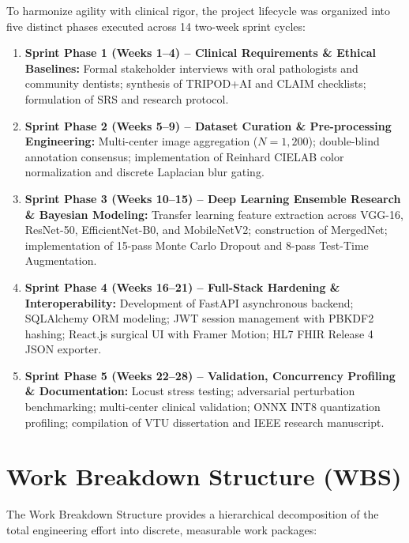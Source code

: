 \documentclass[12pt,a4paper,oneside]{report}
\begin{document}
To harmonize agility with clinical rigor, the project lifecycle was organized into five distinct phases executed across 14 two-week sprint cycles:

\begin{enumerate}[label=\arabic*.]
    \item \textbf{Sprint Phase 1 (Weeks 1--4) -- Clinical Requirements \& Ethical Baselines:} Formal stakeholder interviews with oral pathologists and community dentists; synthesis of TRIPOD+AI and CLAIM checklists; formulation of SRS and research protocol.
    \item \textbf{Sprint Phase 2 (Weeks 5--9) -- Dataset Curation \& Pre-processing Engineering:} Multi-center image aggregation ($N = 1{,}200$); double-blind annotation consensus; implementation of Reinhard CIELAB color normalization and discrete Laplacian blur gating.
    \item \textbf{Sprint Phase 3 (Weeks 10--15) -- Deep Learning Ensemble Research \& Bayesian Modeling:} Transfer learning feature extraction across VGG-16, ResNet-50, EfficientNet-B0, and MobileNetV2; construction of MergedNet; implementation of 15-pass Monte Carlo Dropout and 8-pass Test-Time Augmentation.
    \item \textbf{Sprint Phase 4 (Weeks 16--21) -- Full-Stack Hardening \& Interoperability:} Development of FastAPI asynchronous backend; SQLAlchemy ORM modeling; JWT session management with PBKDF2 hashing; React.js surgical UI with Framer Motion; HL7 FHIR Release 4 JSON exporter.
    \item \textbf{Sprint Phase 5 (Weeks 22--28) -- Validation, Concurrency Profiling \& Documentation:} Locust stress testing; adversarial perturbation benchmarking; multi-center clinical validation; ONNX INT8 quantization profiling; compilation of VTU dissertation and IEEE research manuscript.
\end{enumerate}

\section{Work Breakdown Structure (WBS)}
\label{sec:wbs}

The Work Breakdown Structure provides a hierarchical decomposition of the total engineering effort into discrete, measurable work packages:
\end{document}
